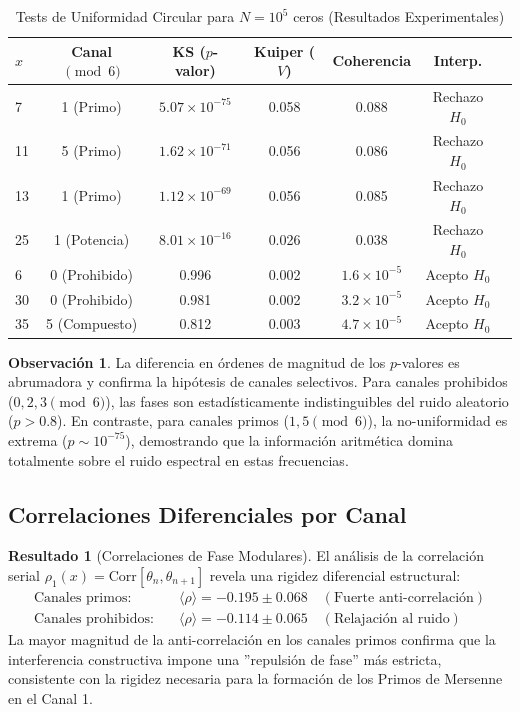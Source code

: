 \documentclass[12pt, a4paper]{article}
\theoremstyle{plain}
\theoremstyle{definition}
\newtheorem{observacion}[teorema]{Observación}
\newtheorem{resultado}[teorema]{Resultado}
\begin{document}
\begin{table}[H]
\centering
\caption{Tests de Uniformidad Circular para $N=10^5$ ceros (Resultados Experimentales)}
\label{tab:tests_uniformidad}
\begin{tabular}{@{}lcccccc@{}}
\toprule
$x$ & Canal $\pmod{6}$ & KS ($p$-valor) & Kuiper ($V$) & Coherencia & Interp. \\
\midrule
7 & 1 (Primo) & $5.07 \times 10^{-75}$ & 0.058 & 0.088 & Rechazo $H_0$ \\
11 & 5 (Primo) & $1.62 \times 10^{-71}$ & 0.056 & 0.086 & Rechazo $H_0$ \\
13 & 1 (Primo) & $1.12 \times 10^{-69}$ & 0.056 & 0.085 & Rechazo $H_0$ \\
25 & 1 (Potencia) & $8.01 \times 10^{-16}$ & 0.026 & 0.038 & Rechazo $H_0$ \\
6 & 0 (Prohibido) & 0.996 & 0.002 & $1.6 \times 10^{-5}$ & Acepto $H_0$ \\
30 & 0 (Prohibido) & 0.981 & 0.002 & $3.2 \times 10^{-5}$ & Acepto $H_0$ \\
35 & 5 (Compuesto) & 0.812 & 0.003 & $4.7 \times 10^{-5}$ & Acepto $H_0$ \\
\bottomrule
\end{tabular}
\end{table}

\begin{observacion}
La diferencia en órdenes de magnitud de los $p$-valores es abrumadora y confirma la hipótesis de canales selectivos. Para canales prohibidos ($0, 2, 3 \pmod 6$), las fases son estadísticamente indistinguibles del ruido aleatorio ($p > 0.8$). En contraste, para canales primos ($1, 5 \pmod 6$), la no-uniformidad es extrema ($p \sim 10^{-75}$), demostrando que la información aritmética domina totalmente sobre el ruido espectral en estas frecuencias.
\end{observacion}

\subsection{Correlaciones Diferenciales por Canal}

\begin{resultado}[Correlaciones de Fase Modulares]
El análisis de la correlación serial $\rho_1(x) = \text{Corr}[\theta_n, \theta_{n+1}]$ revela una rigidez diferencial estructural:
\begin{align*}
\text{Canales primos:} & \quad \langle \rho \rangle = -0.195 \pm 0.068 \quad (\text{Fuerte anti-correlación}) \\
\text{Canales prohibidos:} & \quad \langle \rho \rangle = -0.114 \pm 0.065 \quad (\text{Relajación al ruido})
\end{align*}
La mayor magnitud de la anti-correlación en los canales primos confirma que la interferencia constructiva impone una ''repulsión de fase'' más estricta, consistente con la rigidez necesaria para la formación de los Primos de Mersenne en el Canal 1.
\end{resultado}
\end{document}
